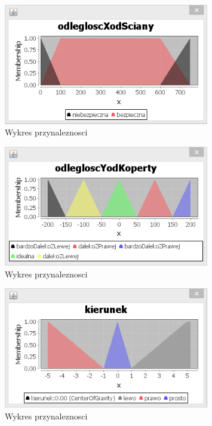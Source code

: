 \documentclass{classrep}
\begin{document}
\begin{figure}[ht]
\centering
	\includegraphics[width=0.8\textwidth,natwidth=610,natheight=642]{pictures/Obraz04.png}
	\caption{Wykres przynaleznosci}
	\label{fig:Wykres przynaleznosci}
\end{figure}

\begin{figure}[ht]
\centering
	\includegraphics[width=0.8\textwidth,natwidth=610,natheight=642]{pictures/Obraz05.png}
	\caption{Wykres przynaleznosci}
	\label{fig:Wykres przynaleznosci}
\end{figure}

\begin{figure}[ht]
\centering
	\includegraphics[width=0.8\textwidth,natwidth=610,natheight=642]{pictures/Obraz06.png}
	\caption{Wykres przynaleznosci}
	\label{fig:Wykres przynaleznosci}
\end{figure}
\end{document}
